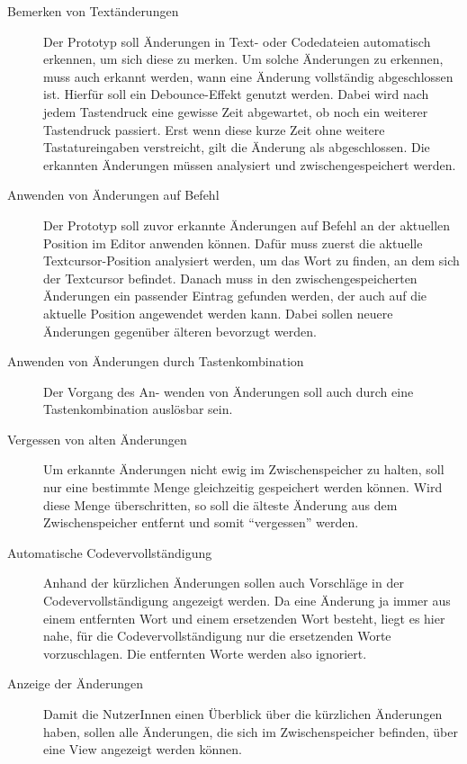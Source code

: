 \begin{description}
    \item[Bemerken von Textänderungen] 
    Der Prototyp soll Änderungen in Text- oder Codedateien automatisch
    erkennen, um sich diese zu merken. Um solche Änderungen
    zu erkennen, muss auch erkannt werden, wann eine Änderung 
    vollständig abgeschlossen ist. Hierfür
    soll ein Debounce-Effekt genutzt werden. 
    Dabei wird nach jedem Tastendruck eine gewisse Zeit abgewartet,
    ob noch ein weiterer Tastendruck passiert. Erst wenn
    diese kurze Zeit ohne weitere Tastatureingaben verstreicht, gilt
    die Änderung als abgeschlossen.
    Die erkannten Änderungen müssen analysiert 
    und zwischengespeichert werden.

    \item[Anwenden von Änderungen auf Befehl] 
    Der Prototyp soll zuvor erkannte Änderungen auf Befehl an der
    aktuellen Position im Editor anwenden können. Dafür muss zuerst die
    aktuelle Textcursor-Position analysiert werden, um das Wort zu finden,
    an dem sich der Textcursor befindet. Danach muss in den 
    zwischengespeicherten Änderungen ein passender Eintrag gefunden werden,
    der auch auf die aktuelle Position angewendet werden kann.
    Dabei sollen neuere Änderungen gegenüber älteren bevorzugt werden.

    \item[Anwenden von Änderungen durch Tastenkombination]
    Der Vorgang des An-\linebreak
    wenden von Änderungen soll auch durch eine
    Tastenkombination auslösbar sein.

    \item[Vergessen von alten Änderungen]
    Um erkannte Änderungen nicht ewig im Zwischenspeicher zu halten,
    soll nur eine bestimmte Menge gleichzeitig gespeichert werden 
    können. Wird diese Menge überschritten, so soll die älteste Änderung
    aus dem Zwischenspeicher entfernt und somit \enquote{vergessen} werden.

    \item[Automatische Codevervollständigung]
    Anhand der kürzlichen Änderungen sollen auch Vorschläge
    in der Codevervollständigung angezeigt werden. 
    Da eine Änderung ja immer aus einem entfernten Wort 
    und einem ersetzenden Wort besteht, liegt es hier nahe,
    für die Codevervollständigung nur die ersetzenden Worte
    vorzuschlagen. Die entfernten Worte werden also ignoriert.

    \item[Anzeige der Änderungen]
    Damit die NutzerInnen einen Überblick über die kürzlichen Änderungen
    haben, sollen alle Änderungen, die sich im Zwischenspeicher befinden,
    über eine View angezeigt werden können.


\end{description}

